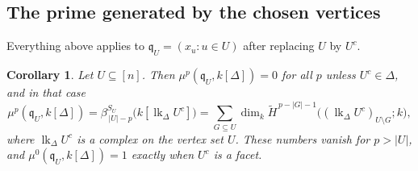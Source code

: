 \documentclass[11pt]{article}
\theoremstyle{plain}
\newtheorem{corollary}[theorem]{Corollary}
\theoremstyle{definition}
\newcommand{\kk}{k}
\newcommand{\link}{\operatorname{lk}}
\newcommand{\rH}{\widetilde{H}}
\begin{document}
\subsection{The prime generated by the chosen vertices}\label{ssec:which-prime}

Everything above applies to $\mathfrak q_U=(x_u:u\in U)$ after replacing $U$ by $U^c$.

\begin{corollary}\label{cor:q-prime}
Let $U\subseteq[n]$. Then $\mu^p(\mathfrak q_U,\kk[\Delta])=0$ for all $p$ unless $U^c\in\Delta$, and in that case
\[
\mu^p(\mathfrak q_U,\kk[\Delta])=\beta^{S_U}_{\,|U|-p}\bigl(\kk[\link_\Delta U^c]\bigr)
=\sum_{G\subseteq U}\dim_\kk\rH^{\,p-|G|-1}\bigl((\link_\Delta U^c)_{U\setminus G};\kk\bigr),
\]
where $\link_\Delta U^c$ is a complex on the vertex set $U$. These numbers vanish for $p>|U|$, and
$\mu^0(\mathfrak q_U,\kk[\Delta])=1$ exactly when $U^c$ is a facet.
\end{corollary}
\end{document}
